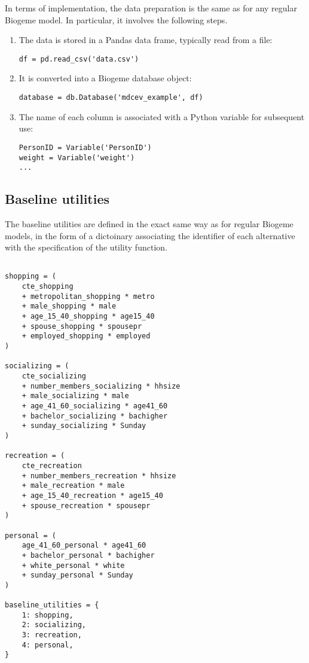 \documentclass[12pt,a4paper]{article}
\begin{document}

In terms of implementation, the data preparation is the same as for any regular Biogeme model. In particular,
it involves the following steps.
\begin{enumerate}
    \item The data is stored in a Pandas data frame, typically read from a file:
\begin{lstlisting}
df = pd.read_csv('data.csv')
\end{lstlisting}
\item It is converted into a Biogeme database object:
\begin{lstlisting}
database = db.Database('mdcev_example', df)
\end{lstlisting}
\item The name of each column is associated with a Python variable for subsequent use:
\begin{lstlisting}
PersonID = Variable('PersonID')
weight = Variable('weight')
...
\end{lstlisting}
\end{enumerate}

\subsection{Baseline utilities}

The baseline utilities are defined in the exact same way as for regular Biogeme models, in the form of a dictoinary associating
the identifier of each alternative with the specification of the utility function.

\begin{lstlisting}

shopping = (
    cte_shopping
    + metropolitan_shopping * metro
    + male_shopping * male
    + age_15_40_shopping * age15_40
    + spouse_shopping * spousepr
    + employed_shopping * employed
)

socializing = (
    cte_socializing
    + number_members_socializing * hhsize
    + male_socializing * male
    + age_41_60_socializing * age41_60
    + bachelor_socializing * bachigher
    + sunday_socializing * Sunday
)

recreation = (
    cte_recreation
    + number_members_recreation * hhsize
    + male_recreation * male
    + age_15_40_recreation * age15_40
    + spouse_recreation * spousepr
)

personal = (
    age_41_60_personal * age41_60
    + bachelor_personal * bachigher
    + white_personal * white
    + sunday_personal * Sunday
)

baseline_utilities = {
    1: shopping,
    2: socializing,
    3: recreation,
    4: personal,
}
\end{lstlisting}
\end{document}
